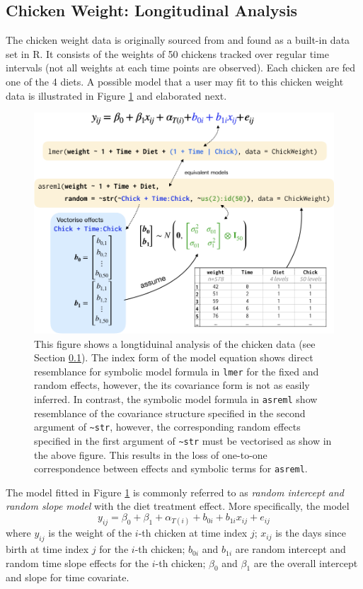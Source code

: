 \documentclass[runningheads]{llncs}
\begin{document}
\hypertarget{chick}{%
\subsection{Chicken Weight: Longitudinal Analysis}\label{chick}}

The chicken weight data is originally sourced from \textcite{chickendata} and found as a built-in data set in R. It consists of the weights of 50 chickens tracked over regular time intervals (not all weights at each time points are observed). Each chicken are fed one of the 4 diets. A possible model that a user may fit to this chicken weight data is illustrated in Figure \ref{fig:symbolic-lmm} and elaborated next.

\begin{figure}
\includegraphics[width=0.9\linewidth,fbox]{images/symbolic_lmm} \caption{This figure shows a longtiduinal analysis of the chicken data (see Section \ref{chick}). The index form of the model equation shows direct resemblance for symbolic model formula in \texttt{lmer} for the fixed and random effects, however, the its covariance form is not as easily inferred. In contrast, the symbolic model formula in \texttt{asreml} show resemblance of the covariance structure specified in the second argument of \texttt{\textasciitilde{}str}, however, the corresponding random effects specified in the first argument of \texttt{\textasciitilde{}str} must be vectorised as show in the above figure. This results in the loss of one-to-one correspondence between effects and symbolic terms for \texttt{asreml}.}\label{fig:symbolic-lmm}
\end{figure}



The model fitted in Figure \ref{fig:symbolic-lmm} is commonly referred to as \emph{random intercept and random slope model} with the diet treatment effect. More specifically, the model
\[y_{ij} = \beta_0 + \beta_1 + \alpha_{T(i)} + b_{0i} + b_{1i}x_{ij} + e_{ij}\]
where \(y_{ij}\) is the weight of the \(i\)-th chicken at time index \(j\); \(x_{ij}\) is the days since birth at time index \(j\) for the \(i\)-th chicken; \(b_{0i}\) and \(b_{1i}\) are random intercept and random time slope effects for the \(i\)-th chicken; \(\beta_0\) and \(\beta_1\) are the overall intercept and slope for time covariate.
\end{document}
